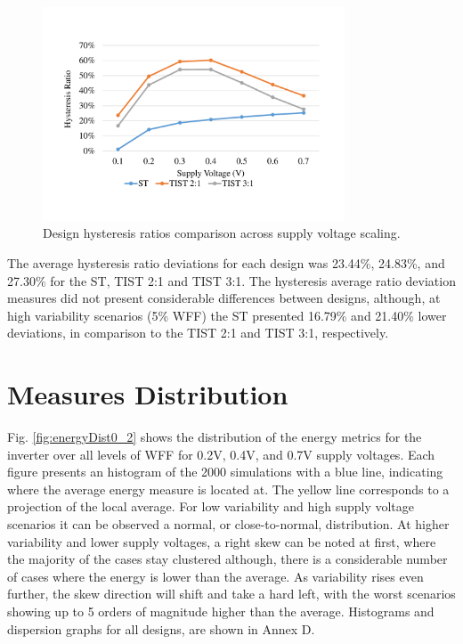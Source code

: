 \documentclass[diss,pgmicro,english]{iiufrgs}
\begin{document}
    \begin{figure}[H]
        \centering
            \includegraphics[width=0.8\textwidth, trim={2cm 3cm 2cm 3cm}, clip]{hystRatiosVdd.pdf}
            \caption{Design hysteresis ratios comparison across supply voltage scaling.}
        \label{fig:hystRatiosVdd}
    \end{figure}

    The average hysteresis ratio deviations for each design was 23.44\%, 24.83\%, and 27.30\% for the ST, TIST 2:1 and TIST 3:1. The hysteresis average ratio deviation measures did not present considerable differences between designs, although, at high variability scenarios (5\% WFF) the ST presented 16.79\% and 21.40\% lower deviations, in comparison to the TIST 2:1 and TIST 3:1, respectively.

\newpage
\section{Measures Distribution}

    Fig. \ref{fig:energyDist0_2} shows the distribution of the energy metrics for the inverter over all levels of WFF for 0.2V, 0.4V, and 0.7V supply voltages. Each figure presents an histogram of the 2000 simulations with a blue line, indicating where the average energy measure is located at. The yellow line corresponds to a projection of the local average. For low variability and high supply voltage scenarios it can be observed a normal, or close-to-normal, distribution. At higher variability and lower supply voltages, a right skew can be noted at first, where the majority of the cases stay clustered although, there is a considerable number of cases where the energy is lower than the average. As variability rises even further, the skew direction will shift and take a hard left, with the worst scenarios showing up to 5 orders of magnitude higher than the average. Histograms and dispersion graphs for all designs, are shown in Annex D.
\end{document}
